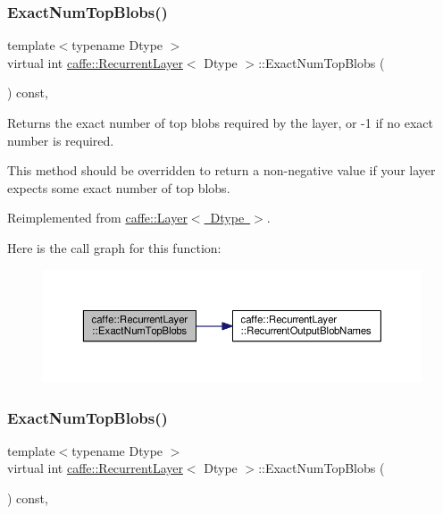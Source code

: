 \subsubsection{\texorpdfstring{Exact\+Num\+Top\+Blobs()}{ExactNumTopBlobs()}\hspace{0.1cm}{\footnotesize\ttfamily [1/2]}}
{\footnotesize\ttfamily template$<$typename Dtype $>$ \\
virtual int \mbox{\hyperlink{classcaffe_1_1_recurrent_layer}{caffe\+::\+Recurrent\+Layer}}$<$ Dtype $>$\+::Exact\+Num\+Top\+Blobs (\begin{DoxyParamCaption}{ }\end{DoxyParamCaption}) const\hspace{0.3cm}{\ttfamily [inline]}, {\ttfamily [virtual]}}



Returns the exact number of top blobs required by the layer, or -\/1 if no exact number is required. 

This method should be overridden to return a non-\/negative value if your layer expects some exact number of top blobs. 

Reimplemented from \mbox{\hyperlink{classcaffe_1_1_layer_a64e2ca72c719e4b2f1f9216ccfb0d37f}{caffe\+::\+Layer$<$ Dtype $>$}}.

Here is the call graph for this function\+:
\nopagebreak
\begin{figure}[H]
\begin{center}
\leavevmode
\includegraphics[width=350pt]{classcaffe_1_1_recurrent_layer_a4cb9032f0942c0fef5f6c7094c7b2ab8_cgraph}
\end{center}
\end{figure}
\mbox{\label{classcaffe_1_1_recurrent_layer_a4cb9032f0942c0fef5f6c7094c7b2ab8}} 
\subsubsection{\texorpdfstring{Exact\+Num\+Top\+Blobs()}{ExactNumTopBlobs()}\hspace{0.1cm}{\footnotesize\ttfamily [2/2]}}
{\footnotesize\ttfamily template$<$typename Dtype $>$ \\
virtual int \mbox{\hyperlink{classcaffe_1_1_recurrent_layer}{caffe\+::\+Recurrent\+Layer}}$<$ Dtype $>$\+::Exact\+Num\+Top\+Blobs (\begin{DoxyParamCaption}{ }\end{DoxyParamCaption}) const\hspace{0.3cm}{\ttfamily [inline]}, {\ttfamily [virtual]}}



